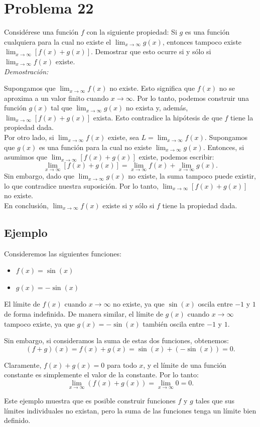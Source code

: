 \section*{Problema 22}
Considérese una función $f$ con la siguiente propiedad: Si $g$ es una función cualquiera para la cual no existe el $\lim_{x \to \infty} g(x)$, entonces tampoco existe $\lim_{x \to \infty} [f(x) + g(x)]$. Demostrar que esto ocurre si y sólo si $\lim_{x \to \infty} f(x)$ existe.\\

\textit{Demostración:}

Supongamos que $\lim_{x \to \infty} f(x)$ no existe. Esto significa que $f(x)$ no se aproxima a un valor finito cuando $x \to \infty$. Por lo tanto, podemos construir una función $g(x)$ tal que $\lim_{x \to \infty} g(x)$ no exista y, además, $\lim_{x \to \infty} [f(x) + g(x)]$ exista. Esto contradice la hipótesis de que $f$ tiene la propiedad dada.\\

Por otro lado, si $\lim_{x \to \infty} f(x)$ existe, sea $L = \lim_{x \to \infty} f(x)$. Supongamos que $g(x)$ es una función para la cual no existe $\lim_{x \to \infty} g(x)$. Entonces, si asumimos que $\lim_{x \to \infty} [f(x) + g(x)]$ existe, podemos escribir:
\[
\lim_{x \to \infty} [f(x) + g(x)] = \lim_{x \to \infty} f(x) + \lim_{x \to \infty} g(x).
\]
Sin embargo, dado que $\lim_{x \to \infty} g(x)$ no existe, la suma tampoco puede existir, lo que contradice nuestra suposición. Por lo tanto, $\lim_{x \to \infty} [f(x) + g(x)]$ no existe.\\

En conclusión, $\lim_{x \to \infty} f(x)$ existe si y sólo si $f$ tiene la propiedad dada.

\subsection*{Ejemplo}

Consideremos las siguientes funciones:
\begin{itemize}
    \item $f(x) = \sin(x)$
    \item $g(x) = -\sin(x)$
\end{itemize}

El límite de $f(x)$ cuando $x \to \infty$ no existe, ya que $\sin(x)$ oscila entre $-1$ y $1$ de forma indefinida. De manera similar, el límite de $g(x)$ cuando $x \to \infty$ tampoco existe, ya que $g(x) = -\sin(x)$ también oscila entre $-1$ y $1$.

Sin embargo, si consideramos la suma de estas dos funciones, obtenemos:
\[(f+g)(x) = f(x) + g(x) = \sin(x) + (-\sin(x)) = 0.\]

Claramente, $f(x) + g(x) = 0$ para todo $x$, y el límite de una función constante es simplemente el valor de la constante. Por lo tanto:
\[\lim_{x \to \infty} (f(x) + g(x)) = \lim_{x \to \infty} 0 = 0.\]

Este ejemplo muestra que es posible construir funciones $f$ y $g$ tales que sus límites individuales no existan, pero la suma de las funciones tenga un límite bien definido.